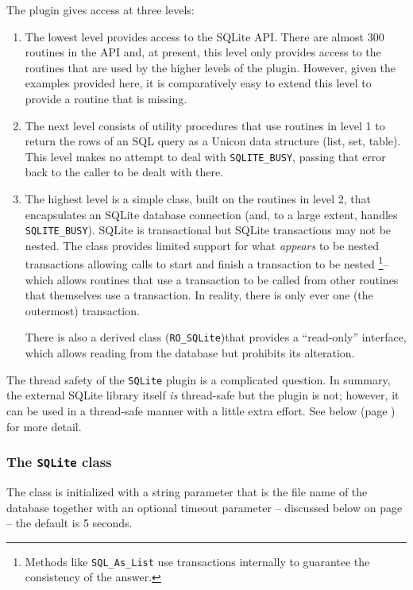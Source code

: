 \medskip
{}
The plugin gives access at three levels:
\begin{enumerate}
\item
  The lowest level provides access to the SQLite API. There are almost 300
  routines in the API and, at present, this level only provides access to the
  routines that are used by the higher levels of the plugin. However, given
  the examples provided here, it is comparatively easy to extend this level to
  provide a routine that is missing.
\item
  The next level consists of utility procedures that use routines in level 1 to
  return the rows of an SQL query as a Unicon data structure (list, set,
  table). This level makes no attempt to deal with \texttt{SQLITE\_BUSY},
  passing that error back to the caller to be dealt with there.
\item
  The highest level is a simple class, built on the routines in level 2, that
  encapsulates an SQLite database connection (and, to a large extent, handles
  \texttt{SQLITE\_BUSY}).  SQLite is transactional but SQLite transactions may
  not be nested. The class provides limited support for what {\em appears\/} to
  be nested transactions allowing calls to start and finish a transaction to be
  nested%
  \footnote{
   Methods like \texttt{SQL\_As\_List} use transactions
   internally to guarantee the consistency of the answer.
  }-- which allows routines that use a transaction to be called from other
  routines that themselves use a transaction. In reality, there is only ever one
  (the outermost) transaction.

  There is also a derived class (\texttt{RO\_SQLite})that provides a
  ``read-only'' interface, which allows reading from the database but
  prohibits its alteration.
\end{enumerate}

The thread safety of the \texttt{SQLite} plugin is a complicated question.
In summary, the external SQLite library itself {\em is\/} thread-safe but the
plugin is not; \WarningNotThreadSafe however, it can be used in a thread-safe
manner with a little extra effort.  See below (page \pageref{SQLite_ThreadSafety})
for more detail.

\subsubsection{The \texttt{SQLite} class}
\label{SQLiteClass}
The class is initialized with a string parameter that is the file name of the
database together with an optional timeout parameter -- discussed below on page
\pageref{SQLite_Timeout}  -- the default is 5 seconds.

